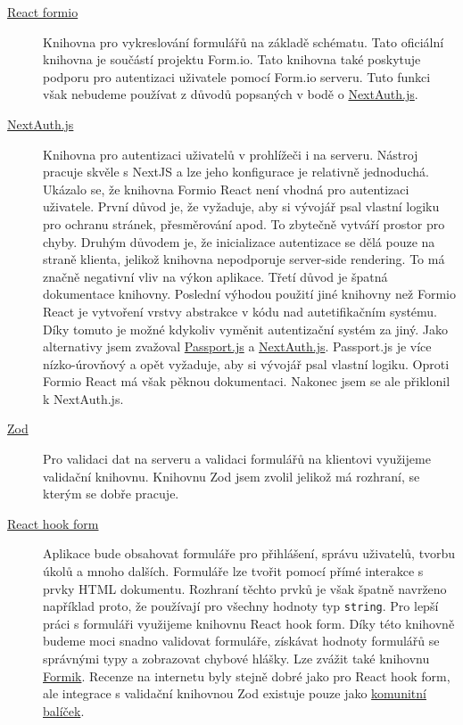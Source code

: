 \begin{description}
    \item[\href{https://github.com/formio/react}{React formio}]
    Knihovna pro vykreslování formulářů na základě schématu.
    Tato oficiální knihovna je součástí projektu Form.io.
    Tato knihovna také poskytuje podporu pro autentizaci uživatele pomocí Form.io serveru.
    Tuto funkci však nebudeme používat z důvodů popsaných v bodě o \href{itm:next-auth}{NextAuth.js}.
    \item[\href{https://next-auth.js.org/}{NextAuth.js}]\label{itm:next-auth}
    Knihovna pro autentizaci uživatelů v prohlížeči i na serveru.
    Nástroj pracuje skvěle s NextJS a lze jeho konfigurace je relativně jednoduchá.
    Ukázalo se, že knihovna Formio React není vhodná pro autentizaci uživatele.
    První důvod je, že vyžaduje, aby si vývojář psal vlastní logiku pro ochranu stránek, přesměrování apod.
    To zbytečně vytváří prostor pro chyby.
    Druhým důvodem je, že inicializace autentizace se dělá pouze na straně klienta, jelikož knihovna nepodporuje server-side rendering.
    To má značně negativní vliv na výkon aplikace.
    Třetí důvod je špatná dokumentace knihovny.
    Poslední výhodou použití jiné knihovny než Formio React je vytvoření vrstvy abstrakce v kódu nad autetifikačním systému.
    Díky tomuto je možné kdykoliv vyměnit autentizační systém za jiný.
    Jako alternativy jsem zvažoval \href{https://www.passportjs.org/}{Passport.js} a \href{https://next-auth.js.org/}{NextAuth.js}.
    Passport.js je více nízko-úrovňový a opět vyžaduje, aby si vývojář psal vlastní logiku.
    Oproti Formio React má však pěknou dokumentaci.
    Nakonec jsem se ale přiklonil k NextAuth.js.
    \item[\href{https://zod.dev/}{Zod}]
    Pro validaci dat na serveru a validaci formulářů na klientovi využijeme validační knihovnu.
    Knihovnu Zod jsem zvolil jelikož má rozhraní, se kterým se dobře pracuje.
    \item[\href{https://react-hook-form.com/}{React hook form}]
    Aplikace bude obsahovat formuláře pro přihlášení, správu uživatelů, tvorbu úkolů a mnoho dalších.
    Formuláře lze tvořit pomocí přímé interakce s prvky HTML dokumentu.
    Rozhraní těchto prvků je však špatně navrženo například proto, že používají pro všechny hodnoty typ \lstinline{string}.
    Pro lepší práci s formuláři využijeme knihovnu React hook form.
    Díky této knihovně budeme moci snadno validovat formuláře, získávat hodnoty formulářů se správnými typy a zobrazovat chybové hlášky.
    Lze zvážit také knihovnu \href{https://formik.org}{Formik}.
    Recenze na internetu byly stejně dobré jako pro React hook form, ale integrace s validační knihovnou Zod existuje pouze jako \href{https://github.com/robertLichtnow/zod-formik-adapter}{komunitní balíček}.

\end{description}
